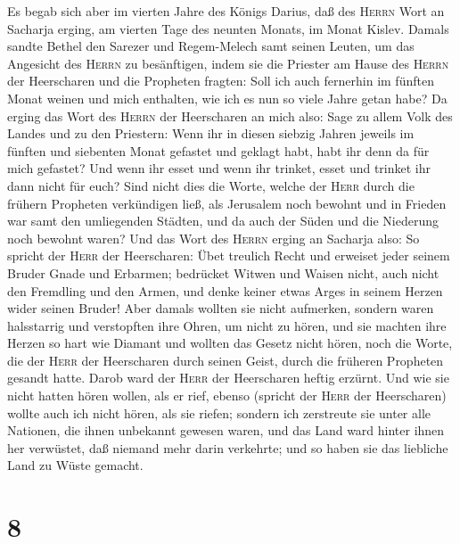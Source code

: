  Es begab sich aber im vierten Jahre des Königs Darius,
daß des \textsc{Herrn} Wort an Sacharja erging, am vierten Tage des
neunten Monats, im Monat Kislev.  Damals sandte Bethel den
Sarezer und Regem-Melech samt seinen Leuten, um das Angesicht des
\textsc{Herrn} zu besänftigen,  indem sie die Priester am
Hause des \textsc{Herrn} der Heerscharen und die Propheten fragten: Soll
ich auch fernerhin im fünften Monat weinen und mich enthalten, wie ich
es nun so viele Jahre getan habe?  Da erging das Wort des
\textsc{Herrn} der Heerscharen an mich also:  Sage zu
allem Volk des Landes und zu den Priestern: Wenn ihr in diesen siebzig
Jahren jeweils im fünften und siebenten Monat gefastet und geklagt habt,
habt ihr denn da für mich gefastet?  Und wenn ihr esset
und wenn ihr trinket, esset und trinket ihr dann nicht für euch?
 Sind nicht dies die Worte, welche der \textsc{Herr} durch
die frühern Propheten verkündigen ließ, als Jerusalem noch bewohnt und
in Frieden war samt den umliegenden Städten, und da auch der Süden und
die Niederung noch bewohnt waren?  Und das Wort des
\textsc{Herrn} erging an Sacharja also:  So spricht der
\textsc{Herr} der Heerscharen: Übet treulich Recht und erweiset jeder
seinem Bruder Gnade und Erbarmen;  bedrücket Witwen und
Waisen nicht, auch nicht den Fremdling und den Armen, und denke keiner
etwas Arges in seinem Herzen wider seinen Bruder!  Aber
damals wollten sie nicht aufmerken, sondern waren halsstarrig und
verstopften ihre Ohren, um nicht zu hören,  und sie
machten ihre Herzen so hart wie Diamant und wollten das Gesetz nicht
hören, noch die Worte, die der \textsc{Herr} der Heerscharen durch
seinen Geist, durch die früheren Propheten gesandt hatte.
 Darob ward der \textsc{Herr} der Heerscharen heftig
erzürnt. Und wie sie nicht hatten hören wollen, als er rief, ebenso
(spricht der \textsc{Herr} der Heerscharen) wollte auch ich nicht hören,
als sie riefen;  sondern ich zerstreute sie unter alle
Nationen, die ihnen unbekannt gewesen waren, und das Land ward hinter
ihnen her verwüstet, daß niemand mehr darin verkehrte; und so haben sie
das liebliche Land zu Wüste gemacht.

\hypertarget{section-7}{%
\section{8}\label{section-7}}

